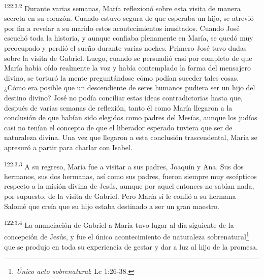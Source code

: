 \par 
\textsuperscript{122:3.2} Durante varias semanas, María reflexionó sobre esta visita de manera secreta en su corazón. Cuando estuvo segura de que esperaba un hijo, se atrevió por fin a revelar a su marido estos acontecimientos inusitados. Cuando José escuchó toda la historia, y aunque confiaba plenamente en María, se quedó muy preocupado y perdió el sueño durante varias noches. Primero José tuvo dudas sobre la visita de Gabriel. Luego, cuando se persuadió casi por completo de que María había oído realmente la voz y había contemplado la forma del mensajero divino, se torturó la mente preguntándose cómo podían suceder tales cosas. ¿Cómo era posible que un descendiente de seres humanos pudiera ser un hijo del destino divino? José no podía conciliar estas ideas contradictorias hasta que, después de varias semanas de reflexión, tanto él como María llegaron a la conclusión de que habían sido elegidos como padres del Mesías, aunque los judíos casi no tenían el concepto de que el liberador esperado tuviera que ser de naturaleza divina. Una vez que llegaron a esta conclusión trascendental, María se apresuró a partir para charlar con Isabel.

\par 
\textsuperscript{122:3.3} A su regreso, María fue a visitar a sus padres, Joaquín y Ana. Sus dos hermanos, sus dos hermanas, así como sus padres, fueron siempre muy escépticos respecto a la misión divina de Jesús, aunque por aquel entonces no sabían nada, por supuesto, de la visita de Gabriel. Pero María sí le confió a su hermana Salomé que creía que su hijo estaba destinado a ser un gran maestro.

\par 
\textsuperscript{122:3.4} La anunciación de Gabriel a María tuvo lugar al día siguiente de la concepción de Jesús, y fue el único acontecimiento de naturaleza sobrenatural\footnote{\textit{Único acto sobrenatural}: Lc 1:26-38.} que se produjo en toda su experiencia de gestar y dar a luz al hijo de la promesa.

